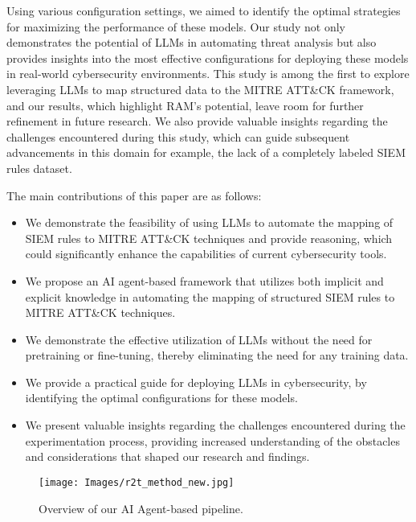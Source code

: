 Using various configuration settings, we aimed to identify the optimal strategies for maximizing the performance of these models. 
Our study not only demonstrates the potential of LLMs in automating threat analysis but also provides insights into the most effective configurations for deploying these models in real-world cybersecurity environments. 
This study is among the first to explore leveraging LLMs to map structured data to the MITRE ATT\&CK framework, and our results, which highlight RAM's potential, leave room for further refinement in future research. 
We also provide valuable insights regarding the challenges encountered during this study, which can guide subsequent advancements in this domain for example, the lack of a completely labeled SIEM rules dataset.

\noindent The main contributions of this paper are as follows:

\begin{itemize}[nosep,leftmargin=*]
    \item We demonstrate the feasibility of using LLMs to automate the mapping of SIEM rules to MITRE ATT\&CK techniques and provide reasoning, which could significantly enhance the capabilities of current cybersecurity tools.
    \item We propose an AI agent-based framework that utilizes both implicit and explicit knowledge in automating the mapping of structured SIEM rules to MITRE ATT\&CK techniques.
    \item We demonstrate the effective utilization of LLMs without the need for pretraining or fine-tuning, thereby eliminating the need for any training data.
    \item We provide a practical guide for deploying LLMs in cybersecurity, by identifying the optimal configurations for these models.
   
    \item We present valuable insights regarding the challenges encountered during the experimentation process, providing increased understanding of the obstacles and considerations that shaped our research and findings.
\end{itemize}


\begin{figure*}[ht!]
    \centering
    \texttt{[image: Images/r2t\_method\_new.jpg]}
    \caption{Overview of our AI Agent-based \methodName pipeline.}
    \label{fig:r2t}
\end{figure*}